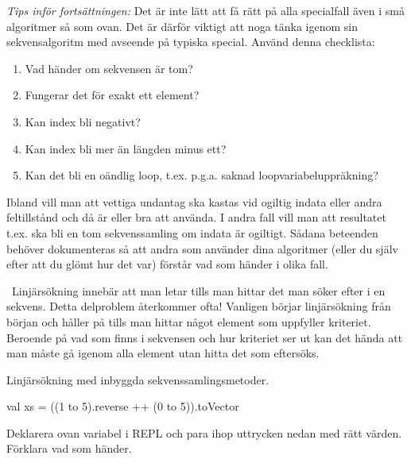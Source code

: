 \QUESTEND




\ifPreSolution
\begin{framed}
\noindent\emph{Tips inför fortsättningen:} Det är inte lätt att få rätt på alla specialfall även i små algoritmer så som  ovan. Det är därför viktigt att noga tänka igenom sin sekvensalgoritm med avseende på typiska special. Använd denna checklista:
\begin{enumerate}[noitemsep]
  \item Vad händer om sekvensen är tom?
  \item Fungerar det för exakt ett element?
  \item Kan index bli negativt?
  \item Kan index bli mer än längden minus ett?
  \item Kan det bli en oändlig loop, t.ex. p.g.a. saknad loopvariabeluppräkning?
\end{enumerate}
Ibland vill man att vettiga undantag ska kastas vid ogiltig indata eller andra feltillstånd och då är  eller  bra att använda. I andra fall vill man att resultatet t.ex. ska bli en tom sekvenssamling om indata är ogiltigt. Sådana beteenden behöver dokumenteras så att andra som använder dina algoritmer (eller du själv efter att du glömt hur det var) förstår vad som händer i olika fall.


\end{framed}
\fi





\QUESTBEGIN

\Task \what~Linjärsökning innebär att man letar tills man hittar det man söker efter i en sekvens. Detta delproblem återkommer ofta! Vanligen börjar linjärsökning från början och håller på tills man hittar något element som uppfyller kriteriet. Beroende på vad som finns i sekvensen och hur kriteriet ser ut kan det hända att man måste gå igenom alla element utan hitta det som eftersöks.

\Subtask Linjärsökning med inbyggda sekvenssamlingsmetoder.
\begin{Code}
val xs = ((1 to 5).reverse ++ (0 to 5)).toVector
\end{Code}
Deklarera ovan variabel i REPL och para ihop uttrycken nedan med rätt värden. Förklara vad som händer.

\begin{ConceptConnections}

\end{ConceptConnections}

